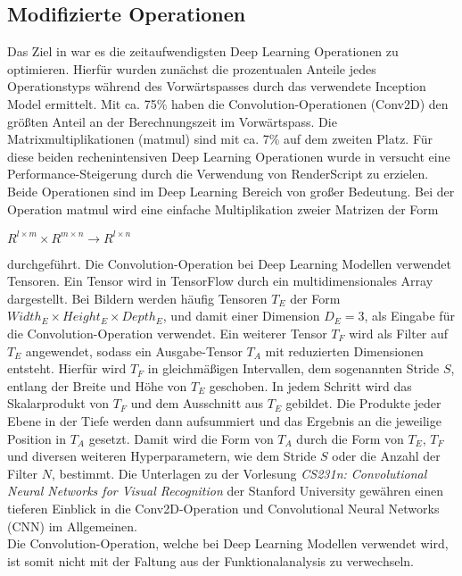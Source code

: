 \subsection{Modifizierte Operationen}
\label{subsec:modoperationen}
Das Ziel in \cite{rstensorflow2017} war es die zeitaufwendigsten Deep Learning Operationen zu optimieren. Hierfür wurden zunächst die prozentualen Anteile jedes Operationstyps während des Vorwärtspasses durch das verwendete Inception Model ermittelt. Mit ca. 75\% haben die Convolution-Operationen (Conv2D) den größten Anteil an der Berechnungszeit im Vorwärtspass. Die Matrixmultiplikationen (matmul) sind mit ca. 7\% auf dem zweiten Platz. Für diese beiden rechenintensiven Deep Learning Operationen wurde in \cite{rstensorflow2017} versucht eine Performance-Steigerung durch die Verwendung von RenderScript zu erzielen. 
\\
Beide Operationen sind im Deep Learning Bereich von großer Bedeutung. Bei der Operation matmul wird eine einfache Multiplikation zweier Matrizen der Form
\begin{center}
	$R^{l \times m} \times R^{m \times n} \rightarrow R^{l \times n}$
\end{center}
durchgeführt. Die Convolution-Operation bei Deep Learning Modellen verwendet Tensoren. Ein Tensor wird in TensorFlow durch ein multidimensionales Array dargestellt. Bei Bildern werden häufig Tensoren $T_{E}$ der Form $Width_{E} \times Height_{E} \times Depth_{E}$, und damit einer Dimension $D_{E} = 3$, als Eingabe für die Convolution-Operation verwendet. Ein weiterer Tensor $T_{F}$ wird als Filter auf $T_{E}$ angewendet, sodass ein Ausgabe-Tensor $T_{A}$ mit reduzierten Dimensionen entsteht. Hierfür wird $T_{F}$ in gleichmäßigen Intervallen, dem sogenannten Stride $S$, entlang der Breite und Höhe von $T_{E}$ geschoben. In jedem Schritt wird das Skalarprodukt von $T_{F}$ und dem Ausschnitt aus $T_{E}$ gebildet. Die Produkte jeder Ebene in der Tiefe werden dann aufsummiert und das Ergebnis an die jeweilige Position in $T_{A}$ gesetzt. Damit wird die Form von $T_{A}$ durch die Form von $T_{E}$, $T_{F}$ und diversen weiteren Hyperparametern, wie dem Stride $S$ oder die Anzahl der Filter $N$, bestimmt. Die Unterlagen zu der Vorlesung \textit{CS231n: Convolutional Neural Networks for Visual Recognition} der Stanford University \cite{stanford-conv} gewähren einen tieferen Einblick in die Conv2D-Operation und Convolutional Neural Networks (CNN) im Allgemeinen. \\
Die Convolution-Operation, welche bei Deep Learning Modellen verwendet wird, ist somit nicht mit der Faltung aus der Funktionalanalysis zu verwechseln. 


